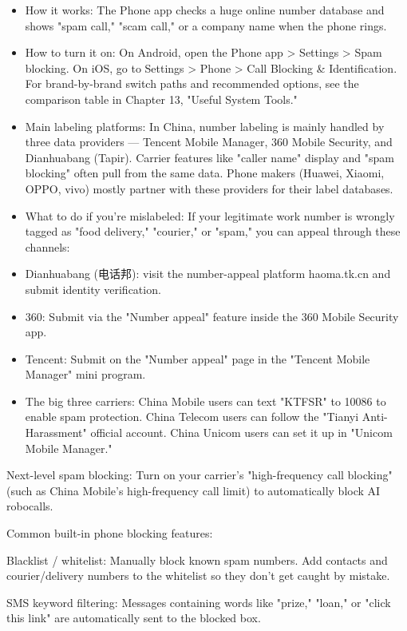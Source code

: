
\begin{itemize}
  \item How it works: The Phone app checks a huge online number database and shows "spam call," "scam call," or a company name when the phone rings.
  \item How to turn it on: On Android, open the Phone app > Settings > Spam blocking. On iOS, go to Settings > Phone > Call Blocking \& Identification. For brand-by-brand switch paths and recommended options, see the comparison table in Chapter 13, "Useful System Tools."
  \item Main labeling platforms: In China, number labeling is mainly handled by three data providers — Tencent Mobile Manager, 360 Mobile Security, and Dianhuabang (Tapir). Carrier features like "caller name" display and "spam blocking" often pull from the same data. Phone makers (Huawei, Xiaomi, OPPO, vivo) mostly partner with these providers for their label databases.
  \item What to do if you're mislabeled: If your legitimate work number is wrongly tagged as "food delivery," "courier," or "spam," you can appeal through these channels:
  \item Dianhuabang (电话邦): visit the number-appeal platform haoma.tk.cn and submit identity verification.
  \item 360: Submit via the "Number appeal" feature inside the 360 Mobile Security app.
  \item Tencent: Submit on the "Number appeal" page in the "Tencent Mobile Manager" mini program.
  \item The big three carriers: China Mobile users can text "KTFSR" to 10086 to enable spam protection. China Telecom users can follow the "Tianyi Anti-Harassment" official account. China Unicom users can set it up in "Unicom Mobile Manager."
\end{itemize}

Next-level spam blocking: Turn on your carrier's "high-frequency call blocking" (such as China Mobile's high-frequency call limit) to automatically block AI robocalls.

Common built-in phone blocking features:

Blacklist / whitelist: Manually block known spam numbers. Add contacts and courier/delivery numbers to the whitelist so they don't get caught by mistake.

SMS keyword filtering: Messages containing words like "prize," "loan," or "click this link" are automatically sent to the blocked box.


